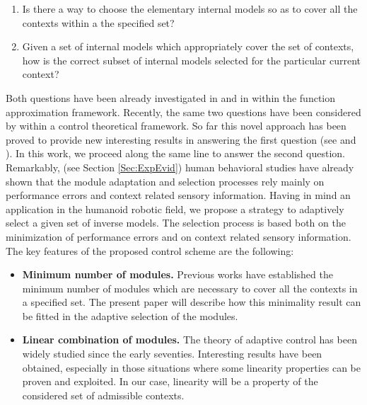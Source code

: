 \documentclass{svmult}
\begin{document}
\begin{enumerate}

\item Is there a way to choose the elementary internal models so as to
cover all the contexts within a the specified set?

\item Given a set of internal models which appropriately cover the set
of contexts, how is the correct subset of internal models selected 
for the particular current context?

\end{enumerate}

Both questions have been already investigated in
\cite{WolpertKawato1998} and in \cite{MussaIvaldi1992BiolCyb} within
the function approximation framework. Recently, the same two
questions have been considered by \cite{NoriBiolCyb2005} within a
control theoretical framework. So far this novel approach has
been proved to provide new interesting results in answering the
first question (see \cite{NoriFrezzaCdc04} and
\cite{NoriPhDThesis}). In this work, we proceed along the
same line to answer the second question. Remarkably, (see Section
\ref{Sec:ExpEvid}) human behavioral studies have already shown 
that the module adaptation and selection processes rely mainly 
on performance errors and context related sensory information. 
Having in mind an application in the humanoid robotic field, we propose a
strategy to adaptively select a given set of inverse models. The
selection process is based both on the minimization of performance
errors and on context related sensory information. The key
features of the proposed control scheme are the following:

\begin{itemize}

\item \textbf{Minimum number of modules.} Previous works \cite{NoriPhDThesis}
have established the minimum number of modules which are necessary
to cover all the contexts in a specified set. The present paper will
describe how this minimality result can be fitted in the adaptive
selection of the modules.

\item \textbf{Linear combination of modules.} The theory of adaptive
control has been widely studied since the early seventies.
Interesting results have been obtained, especially in those
situations where some linearity properties can be proven and
exploited. In our case, linearity will be a property of the
considered set of admissible contexts.
\end{itemize}
\end{document}

